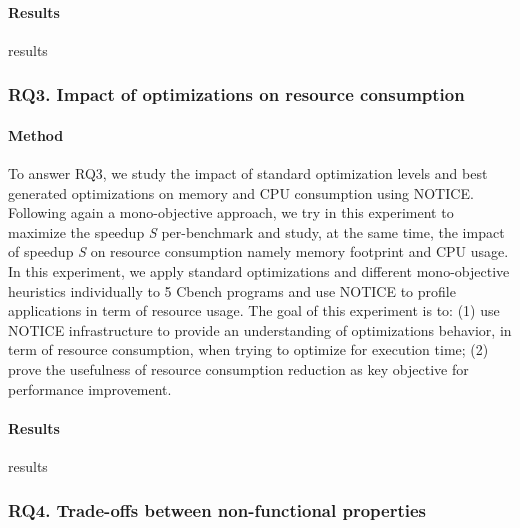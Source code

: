 \paragraph{Results}
results

\noindent{}
\subsubsection{RQ3. Impact of optimizations on resource consumption}
\paragraph{Method}
To answer RQ3, we study the impact of standard optimization levels and best generated optimizations on memory and CPU consumption using NOTICE. Following again a mono-objective approach, we try in this experiment to maximize the speedup \textit{S} per-benchmark and study, at the same time, the impact of speedup \textit{S} on resource consumption namely memory footprint and CPU usage. 
In this experiment, we apply standard optimizations and different mono-objective heuristics individually to 5 Cbench programs and use NOTICE to profile applications in term of resource usage.   
The goal of this experiment is to: (1) use NOTICE infrastructure to provide an understanding of optimizations behavior, in term of resource consumption, when trying to optimize for execution time; (2) prove the usefulness of resource consumption reduction as key objective for performance improvement.




\paragraph{Results}

results

\noindent{}
\subsubsection{RQ4. Trade-offs between non-functional properties}
